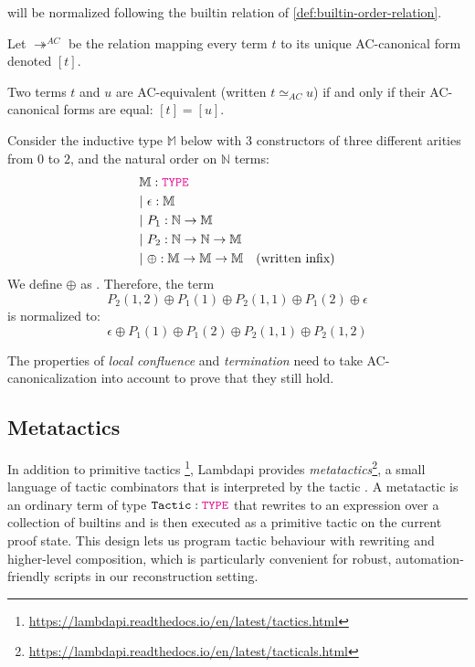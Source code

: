 will be normalized following the builtin relation of \cref{def:builtin-order-relation}.

\begin{definition}
Let $\twoheadrightarrow^{AC}$  be the relation mapping every term $t$ to its unique AC-canonical form denoted $[t]$.
\end{definition}

\begin{definition}[AC equivalence]
Two terms $t$ and $u$ are AC-equivalent (written $t \simeq_{AC} u$) if and only if their AC-canonical forms are equal: $[t] = [u]$.
\end{definition}

\begin{example}
Consider the inductive type $\mathbb{M}$ below with 3 constructors of three different arities from $0$ to $2$, and the natural order on $\mathbb{N}$ terms:
\begin{align*}
&\bb{M}: \type \\
&|~\epsilon : \bb{M} \\
&|~P_1: \N \ra \bb{M} \\
&|~P_2 : \N \ra \N \ra \bb{M} \\
&|~ \oplus : \bb{M} \to \bb{M} \to \bb{M} \quad \text{(written infix)}
\end{align*}
We define $\oplus$ as . Therefore, the term
\[
  P_2(1,2) \oplus P_1(1) \oplus P_2(1,1) \oplus P_1(2) \oplus \epsilon
\]
is normalized to:
\[
  \epsilon \oplus P_1(1) \oplus P_1(2) \oplus P_2(1,1) \oplus P_2(1,2)
\]
\end{example}

\begin{remark}
The properties of \emph{local confluence} and \emph{termination} need to take AC-canonicalization into account to prove that they still hold.
\end{remark}

\subsection{Metatactics}
\label{sec:metatactic}

In addition to primitive tactics \footnote{\url{https://lambdapi.readthedocs.io/en/latest/tactics.html}}, Lambdapi provides \emph{metatactics}\footnote{\url{https://lambdapi.readthedocs.io/en/latest/tacticals.html}}, a small language of tactic combinators that is interpreted by the tactic \eval.
A metatactic is an ordinary term of type $\kw{Tactic}: \type$ that rewrites to an expression over a collection of builtins and is then executed as a primitive tactic on the current proof state.
This design lets us program tactic behaviour with rewriting and higher-level composition, which is particularly convenient for robust, automation-friendly scripts in our reconstruction setting.

